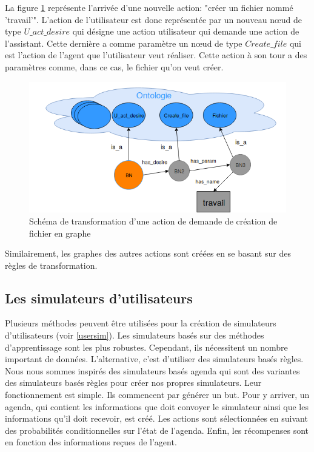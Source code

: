 \par La figure \ref{nonabstract_onto} représente l'arrivée d'une nouvelle action: "créer un fichier nommé 'travail'". L'action de l'utilisateur est donc représentée par un nouveau n\oe{}ud de type $U\_act\_desire$ qui désigne une action utilisateur qui demande une action de l'assistant. Cette dernière a comme paramètre un n\oe{}ud de type $Create\_file$ qui est l'action de l'agent que l'utilisateur veut réaliser. Cette action à son tour a des paramètres comme, dans ce cas, le fichier qu'on veut créer.
\begin{figure}[H] 
	\centering
	\includegraphics[width=0.88\linewidth]{images/Conception/DM/nonabstract_onto.png}
	\caption{Schéma de transformation d'une action de demande de création de fichier en graphe}\label{nonabstract_onto}
	
\end{figure}
\par Similairement, les graphes des autres actions sont créées en se basant sur des règles de transformation.
\subsection{Les simulateurs d'utilisateurs}
Plusieurs méthodes peuvent être utilisées pour la création de simulateurs d'utilisateurs (voir \ref{usersim}). Les simulateurs basés sur des méthodes d'apprentissage sont les plus robustes. Cependant, ils nécessitent un nombre important de données. L'alternative, c'est d'utiliser des simulateurs basés règles. Nous nous sommes inspirés des simulateurs basés agenda \citep{Schatzmann2007} qui sont des variantes des simulateurs basés règles pour créer nos propres simulateurs. Leur fonctionnement est simple. Ils commencent par générer un but. Pour y arriver, un agenda, qui contient les informations que doit convoyer le simulateur ainsi que les informations qu'il doit recevoir, est créé. Les actions sont sélectionnées en suivant des probabilités conditionnelles sur l'état de l'agenda. Enfin, les récompenses sont en fonction des informations reçues de l'agent.
